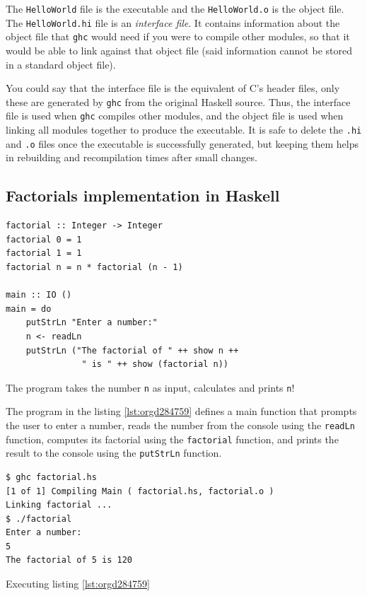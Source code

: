 \documentclass[a4paper, titlepage, twoside]{article}
\begin{document}
The \texttt{HelloWorld} file is the executable and the \texttt{HelloWorld.o} is the object file. The \texttt{HelloWorld.hi} file is an \emph{interface file}. It contains information about the object file that \texttt{ghc} would need if you were to compile other modules, so that it would be able to link against that object file (said information cannot be stored in a standard object file).

You could say that the interface file is the equivalent of C's header files, only these are generated by \texttt{ghc} from the original Haskell source. Thus, the interface file is used when \texttt{ghc} compiles other modules, and the object file is used when linking all modules together to produce the executable. It is safe to delete the \texttt{.hi} and \texttt{.o} files once the executable is successfully generated, but keeping them helps in rebuilding and recompilation times after small changes.

\subsection{Factorials implementation in Haskell}
\label{sec:orga7eceb1}

\begin{listing}[htbp]
\begin{verbatim}
factorial :: Integer -> Integer
factorial 0 = 1
factorial 1 = 1
factorial n = n * factorial (n - 1)

main :: IO ()
main = do
    putStrLn "Enter a number:"
    n <- readLn
    putStrLn ("The factorial of " ++ show n ++
               " is " ++ show (factorial n))
\end{verbatim}
\caption{\label{lst:orgd284759}The program takes the number \texttt{n} as input, calculates and prints \texttt{n}!}
\end{listing}

The program in the listing \ref{lst:orgd284759} defines a main function that prompts the user to enter a number, reads the number from the console using the \texttt{readLn} function, computes its factorial using the \texttt{factorial} function, and prints the result to the console using the \texttt{putStrLn} function.

\begin{listing}[htbp]
\begin{verbatim}
$ ghc factorial.hs
[1 of 1] Compiling Main ( factorial.hs, factorial.o )
Linking factorial ...
$ ./factorial
Enter a number:
5
The factorial of 5 is 120
\end{verbatim}
\caption{Executing listing \ref{lst:orgd284759}}
\end{listing}
\end{document}
